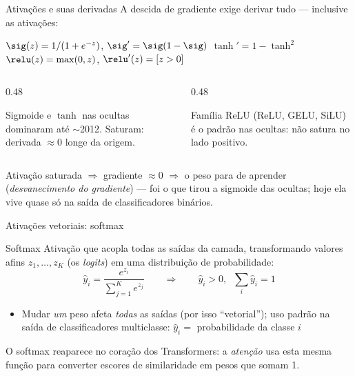 \documentclass[aspectratio=169, 11pt]{beamer}
\begin{document}
\begin{frame}{Ativações e suas derivadas}
  A descida de gradiente exige derivar tudo — inclusive as ativações:
  \begin{center}\small
    $\sig(z) = 1/(1+e^{-z})$,\; $\sig' = \sig(1-\sig)$
    \qquad
    $\tanh' = 1 - \tanh^2$
    \qquad
    $\relu(z) = \max(0, z)$,\; $\relu'(z) = [z > 0]$
  \end{center}

  \begin{columns}[T]
    \begin{column}{0.48\textwidth}
      \begin{tcolorbox}[iccaixa=icCinza, title={Histórico}]
        \small Sigmoide e $\tanh$ nas ocultas dominaram até $\sim$2012.
        Saturam: derivada $\approx 0$ longe da origem.
      \end{tcolorbox}
    \end{column}
    \begin{column}{0.48\textwidth}
      \begin{tcolorbox}[iccaixa=icVerde, title={Moderno}]
        \small Família ReLU (ReLU, GELU, SiLU) é o padrão nas ocultas:
        não satura no lado positivo.
      \end{tcolorbox}
    \end{column}
  \end{columns}

  \begin{alertabox}
    Ativação saturada $\Rightarrow$ gradiente $\approx 0$ $\Rightarrow$ o peso
    \alert{para de aprender} (\emph{desvanecimento do gradiente}) — foi o que
    tirou a sigmoide das ocultas; hoje ela vive quase só na saída de
    classificadores binários.
  \end{alertabox}
\end{frame}

\begin{frame}{Ativações vetoriais: softmax}
  \begin{defbox}{Softmax}
    Ativação que acopla todas as saídas da camada, transformando valores afins
    $z_1, \dots, z_K$ (os \emph{logits}) em uma distribuição de probabilidade:
    \[
      \hat{y}_i = \frac{e^{z_i}}{\sum_{j=1}^{K} e^{z_j}}
      \qquad\Longrightarrow\qquad
      \hat{y}_i > 0, \;\; \sum_i \hat{y}_i = 1
    \]
  \end{defbox}

  \begin{itemize}\setlength{\itemsep}{0.2ex}
    \item Mudar \emph{um} peso afeta \emph{todas} as saídas (por isso ``vetorial'');
          uso padrão na saída de classificadores multiclasse:
          $\hat{y}_i = $ probabilidade da classe $i$
  \end{itemize}

  \begin{ideiabox}
    O softmax reaparece no coração dos Transformers: a \emph{atenção} usa esta
    mesma função para converter escores de similaridade em pesos que somam 1.
  \end{ideiabox}
\end{frame}
\end{document}
